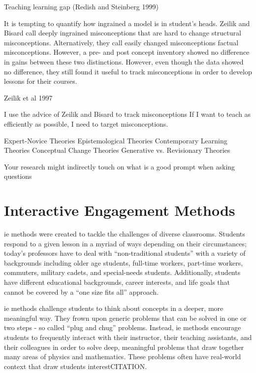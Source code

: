 Teaching learning gap (Redish and Steinberg 1999)

It is tempting to quantify how ingrained a model is in student's heads. Zeilik and Bisard call deeply ingrained misconceptions that are hard to change structural misconceptions. Alternatively, they call easily changed misconceptions factual misconceptions\cite{zeilik2000}. However, a pre- and post concept inventory showed no difference in gains between these two distinctions. However, even though the data showed no difference, they still found it useful to track misconceptions in order to develop lessons for their courses.

Zeilik et al 1997

I use the advice of Zeilik and  Bisard to track misconceptions\cite{zeilik2000}
If I want to teach as efficiently as possible, I need to target misconceptions.

Expert-Novice Theories
Epistemological Theories
Contemporary Learning Theories
Conceptual Change Theories
Generative vs. Revisionary Theories

Your research might indirectly touch on what is a good prompt when asking questions

\section{Interactive Engagement Methods}

\gls{ie} methods were created to tackle the challenges of diverse classrooms. Students respond to a given lesson in a myriad of ways depending on their circumstances; today's professors have to deal with ``non-traditional students'' with a variety of backgrounds including older age students, full-time workers, part-time workers, commuters, military cadets, and special-needs students. Additionally, students have different educational backgrounds, career interests, and life goals that cannot be covered by a ``one size fits all'' approach\cite{novak1999}.

\gls{ie} methods challenge students to think about concepts in a deeper, more meaningful way. They frown upon generic problems that can be solved in one or two steps - so called ``plug and chug'' problems. Instead, \gls{ie} methods encourage students to frequently interact with their instructor, their teaching assistants, and their colleagues in order to solve deep, meaningful problems that draw together many areas of physics and mathematics. These problems often have real-world context that draw students interestCITATION.

